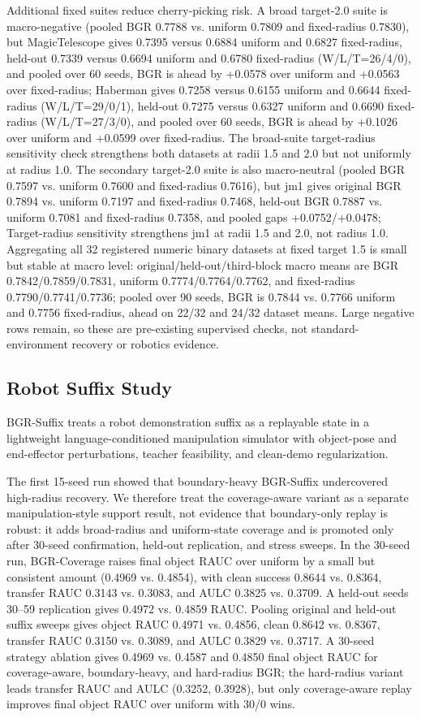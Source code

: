 \documentclass[letterpaper]{article}
\begin{document}
Additional fixed suites reduce cherry-picking risk. A broad target-2.0 suite is macro-negative (pooled BGR 0.7788 vs. uniform 0.7809 and fixed-radius 0.7830), but MagicTelescope gives 0.7395 versus 0.6884 uniform and 0.6827 fixed-radius, held-out 0.7339 versus 0.6694 uniform and 0.6780 fixed-radius (W/L/T=26/4/0), and pooled over 60 seeds, BGR is ahead by +0.0578 over uniform and +0.0563 over fixed-radius; Haberman gives 0.7258 versus 0.6155 uniform and 0.6644 fixed-radius (W/L/T=29/0/1), held-out 0.7275 versus 0.6327 uniform and 0.6690 fixed-radius (W/L/T=27/3/0), and pooled over 60 seeds, BGR is ahead by +0.1026 over uniform and +0.0599 over fixed-radius. The broad-suite target-radius sensitivity check strengthens both datasets at radii 1.5 and 2.0 but not uniformly at radius 1.0. The secondary target-2.0 suite is also macro-neutral (pooled BGR 0.7597 vs. uniform 0.7600 and fixed-radius 0.7616), but jm1 gives original BGR 0.7894 vs. uniform 0.7197 and fixed-radius 0.7468, held-out BGR 0.7887 vs. uniform 0.7081 and fixed-radius 0.7358, and pooled gaps +0.0752/+0.0478; Target-radius sensitivity strengthens jm1 at radii 1.5 and 2.0, not radius 1.0. Aggregating all 32 registered numeric binary datasets at fixed target 1.5 is small but stable at macro level: original/held-out/third-block macro means are BGR 0.7842/0.7859/0.7831, uniform 0.7774/0.7764/0.7762, and fixed-radius 0.7790/0.7741/0.7736; pooled over 90 seeds, BGR is 0.7844 vs. 0.7766 uniform and 0.7756 fixed-radius, ahead on 22/32 and 24/32 dataset means. Large negative rows remain, so these are pre-existing supervised checks, not standard-environment recovery or robotics evidence.

\subsection{Robot Suffix Study}

BGR-Suffix treats a robot demonstration suffix as a replayable state in a lightweight language-conditioned manipulation simulator with object-pose and end-effector perturbations, teacher feasibility, and clean-demo regularization.

The first 15-seed run showed that boundary-heavy BGR-Suffix undercovered high-radius recovery. We therefore treat the coverage-aware variant as a separate manipulation-style support result, not evidence that boundary-only replay is robust: it adds broad-radius and uniform-state coverage and is promoted only after 30-seed confirmation, held-out replication, and stress sweeps. In the 30-seed run, BGR-Coverage raises final object RAUC over uniform by a small but consistent amount (0.4969 vs. 0.4854), with clean success 0.8644 vs. 0.8364, transfer RAUC 0.3143 vs. 0.3083, and AULC 0.3825 vs. 0.3709. A held-out seeds 30--59 replication gives 0.4972 vs. 0.4859 RAUC. Pooling original and held-out suffix sweeps gives object RAUC 0.4971 vs. 0.4856, clean 0.8642 vs. 0.8367, transfer RAUC 0.3150 vs. 0.3089, and AULC 0.3829 vs. 0.3717. A 30-seed strategy ablation gives 0.4969 vs. 0.4587 and 0.4850 final object RAUC for coverage-aware, boundary-heavy, and hard-radius BGR; the hard-radius variant leads transfer RAUC and AULC (0.3252, 0.3928), but only coverage-aware replay improves final object RAUC over uniform with 30/0 wins.
\end{document}
